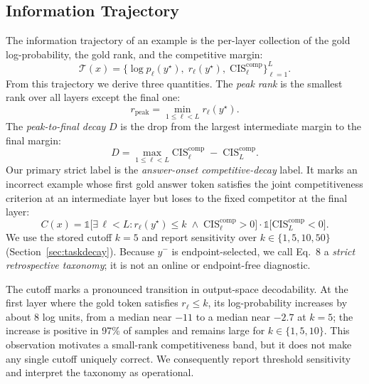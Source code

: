\documentclass{article} %
\begin{document}
\subsection{Information Trajectory}
The information trajectory of an example is the per-layer collection of the gold log-probability, the gold rank, and the competitive margin:
\begin{equation}
\mathcal{T}(x) = \big\{ \log p_\ell(y^\star),\; r_\ell(y^\star),\; \mathrm{CIS}^{\mathrm{comp}}_\ell \big\}_{\ell=1}^{L} .
\end{equation}
From this trajectory we derive three quantities. The \emph{peak rank} is the smallest rank over all layers except the final one:
\begin{equation}
r_{\mathrm{peak}} = \min_{1 \le \ell < L} r_\ell(y^\star) .
\end{equation}
The \emph{peak-to-final decay} $D$ is the drop from the largest intermediate margin to the final margin:
\begin{equation}
D = \max_{1 \le \ell < L} \mathrm{CIS}^{\mathrm{comp}}_\ell \;-\; \mathrm{CIS}^{\mathrm{comp}}_L .
\end{equation}
Our primary strict label is the \emph{answer-onset competitive-decay} label. It marks an incorrect example whose first gold answer token satisfies the joint competitiveness criterion at an intermediate layer but loses to the fixed competitor at the final layer:
\begin{equation}
C(x) = \mathbb{1}\Big[ \exists\, \ell < L : r_\ell(y^\star) \le k \;\land\; \mathrm{CIS}^{\mathrm{comp}}_\ell > 0 \Big] \cdot \mathbb{1}\Big[ \mathrm{CIS}^{\mathrm{comp}}_L < 0 \Big] .
\end{equation}
We use the stored cutoff $k=5$ and report sensitivity over $k \in \{1,5,10,50\}$ (Section~\ref{sec:taskdecay}). Because $y^-$ is endpoint-selected, we call Eq.~8 a \emph{strict retrospective taxonomy}; it is not an online or endpoint-free diagnostic.

The cutoff marks a pronounced transition in output-space decodability. At the first layer where the gold token satisfies $r_\ell\leq k$, its log-probability increases by about $8$ log units, from a median near $-11$ to a median near $-2.7$ at $k=5$; the increase is positive in 97\% of samples and remains large for $k\in\{1,5,10\}$. This observation motivates a small-rank competitiveness band, but it does not make any single cutoff uniquely correct. We consequently report threshold sensitivity and interpret the taxonomy as operational.
\end{document}
